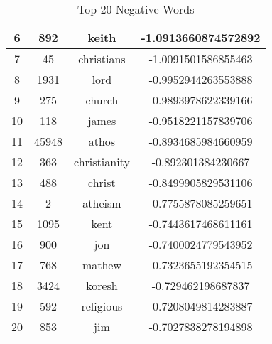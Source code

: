 \documentclass[twoside]{homework}
\begin{document}
\begin{itemize}
\begin{itemize}
\begin{table}[h!]
\begin{tabular}{||c c c c||}
                \hline
                6 & 892 & keith & -1.0913660874572892\\
                \hline
                7 & 45 & christians & -1.0091501586855463\\
                \hline
                8 & 1931 & lord & -0.9952944263553888\\
                \hline
                9 & 275 & church & -0.9893978622339166\\
                \hline
                10 & 118 & james & -0.9518221157839706\\
                \hline
                11 & 45948 & athos & -0.8934685984660959\\
                \hline
                12 & 363 & christianity & -0.892301384230667\\
                \hline
                13 & 488 & christ & -0.8499905829531106\\
                \hline
                14 & 2 & atheism & -0.7755878085259651\\
                \hline
                15 & 1095 & kent & -0.7443617468611161\\
                \hline
                16 & 900 & jon & -0.7400024779543952\\
                \hline
                17 & 768 & mathew & -0.7323655192354515\\
                \hline
                18 & 3424 & koresh & -0.729462198687837\\
                \hline
                19 & 592 & religious & -0.7208049814283887\\
                \hline
                20 & 853 & jim & -0.7027838278194898\\
                \hline
                \end{tabular}
                \caption{Top 20 Negative Words}
                \label{table:4}
            \end{table}
        \end{itemize}
\end{itemize}
\clearpage
\end{document}
